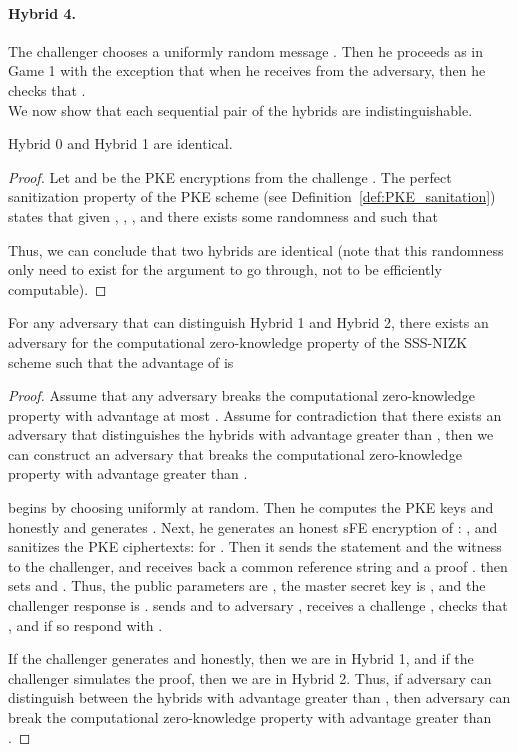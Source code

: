\documentclass{llncs}
\begin{document}
\paragraph{Hybrid 4.} The challenger chooses a uniformly random message . Then he proceeds as in Game 1 with the exception that when he receives  from the adversary, then he checks that . \\

We now show that each sequential pair of the hybrids are indistinguishable.

\begin{claim} \label{claim:sFE_san_PKE}
Hybrid 0 and Hybrid 1 are identical.
\end{claim}

\begin{proof}
Let  and  be the PKE encryptions from the challenge . The perfect sanitization property of the PKE scheme (see Definition~\ref{def:PKE_sanitation}) states that given , , , and  there exists some randomness  and  such that
	
Thus, we can conclude that two hybrids are identical (note that this randomness only need to exist for the argument to go through, not to be efficiently computable). 
\end{proof}


\begin{claim} \label{claim:sFE_san_ZK_1}
For any adversary  that can distinguish Hybrid 1 and Hybrid 2, there exists an adversary  for the computational zero-knowledge property of the SSS-NIZK scheme such that the advantage of  is 

\end{claim}

\begin{proof} 
Assume that any adversary breaks the computational zero-knowledge property with advantage at most . Assume for contradiction that there exists an adversary  that distinguishes the hybrids with advantage greater than , then we can construct an adversary  that breaks the computational zero-knowledge property with advantage greater than .

 begins by choosing  uniformly at random. Then he computes the PKE keys  and  honestly and generates . Next, he generates an honest sFE encryption of : , and sanitizes the PKE ciphertexts:  for . 
Then it sends the statement  and the witness  to the challenger, and receives back a common reference string  and a proof . 
 then sets  and . Thus, the public parameters are , the master secret key is , and the challenger response is . 
 sends  and  to adversary , receives a challenge , checks that , and if so respond with . 

If the challenger generates  and  honestly, then we are in Hybrid 1, and if the challenger simulates the proof, then we are in Hybrid 2. 
Thus, if adversary  can distinguish between the hybrids with advantage greater than , then adversary  can break the computational zero-knowledge property with advantage greater than .
\end{proof}
\end{document}
